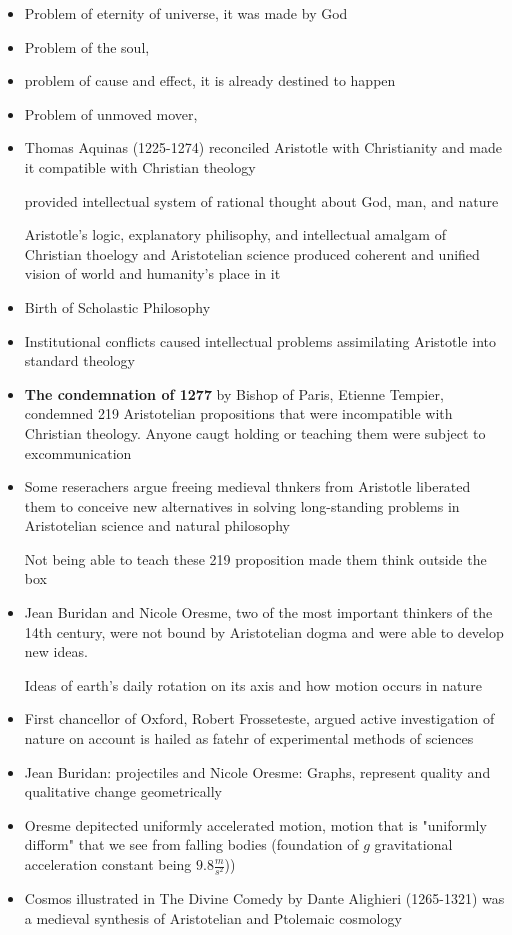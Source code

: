 \documentclass{article}
\begin{document}
\begin{itemize}
  \item Problem of eternity of universe, it was made by God
  \item Problem of the soul,
  \item problem of cause and effect, it is already destined to happen
  \item Problem of unmoved mover,
  \item Thomas Aquinas (1225-1274) reconciled Aristotle with Christianity
    and made it compatible with Christian theology

    provided intellectual system of rational thought about God, man, and nature

    Aristotle's logic, explanatory philisophy, and intellectual amalgam of Christian thoelogy and Aristotelian science
    produced coherent and unified vision of world and humanity's place in it

  \item Birth of Scholastic Philosophy
  \item Institutional conflicts caused intellectual problems assimilating Aristotle into standard theology
  \item \textbf{The condemnation of 1277} by Bishop of Paris, Etienne Tempier,
    condemned 219 Aristotelian propositions that were incompatible with Christian theology.
    Anyone caugt holding or teaching them were subject to excommunication
  \item Some reserachers argue freeing medieval thnkers from Aristotle liberated them to conceive
    new alternatives in solving long-standing problems in Aristotelian science and natural philosophy

    Not being able to teach these 219 proposition made them think outside the box
  \item Jean Buridan and Nicole Oresme, two of the most important thinkers of the 14th century,
    were not bound by Aristotelian dogma and were able to develop new ideas.

    Ideas of earth's daily rotation on its axis and how motion occurs in nature
  \item First chancellor of Oxford, Robert Frosseteste, argued active investigation of nature on account
    is hailed as fatehr of experimental methods of sciences
  \item Jean Buridan: projectiles and Nicole Oresme: Graphs, represent quality and qualitative change geometrically
  \item Oresme depitected uniformly accelerated motion, motion that is "uniformly difform" that we see from
    falling bodies (foundation of $g$ gravitational acceleration constant being $9.8\frac{m}{s^2}$))
  \item Cosmos illustrated in The Divine Comedy by Dante Alighieri (1265-1321)
    was a medieval synthesis of Aristotelian and Ptolemaic cosmology


\end{itemize}
\end{document}
